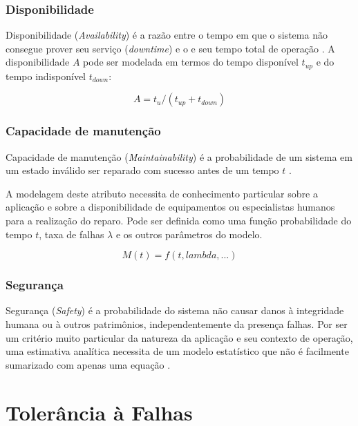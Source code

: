 \subsubsection{Disponibilidade}

Disponibilidade (\textit{Availability}) é a razão entre o tempo em que o sistema não consegue prover seu serviço (\textit{downtime}) e o e seu tempo total de operação \cite{FaultInjectionTechniques}. A disponibilidade $A$ pode ser modelada em termos do tempo disponível $t_{up}$ e do tempo indisponível $t_{down}$:

\begin{equation}
    A = t_u / (t_{up} + t_{down})
\end{equation}

\subsubsection{Capacidade de manutenção}

Capacidade de manutenção (\textit{Maintainability}) é a probabilidade de um sistema em um estado inválido ser reparado com sucesso antes de um tempo $t$ \cite{FaultInjectionTechniques}.

A modelagem deste atributo necessita de conhecimento particular sobre a aplicação e sobre a disponibilidade de equipamentos ou especialistas humanos para a realização do reparo. Pode ser definida como uma função probabilidade do tempo $t$, taxa de falhas $\lambda$ e os outros parâmetros do modelo.

\begin{equation}
    M(t) = f(t, lambda, ...)
\end{equation}

\subsubsection{Segurança}

Segurança (\textit{Safety}) é a probabilidade do sistema não causar danos à integridade humana ou à outros patrimônios, independentemente da presença falhas. Por ser um critério muito particular da natureza da aplicação e seu contexto de operação, uma estimativa analítica necessita de um modelo estatístico que não é facilmente sumarizado com apenas uma equação \cite{FaultInjectionTechniques}.

\section{Tolerância à Falhas}

